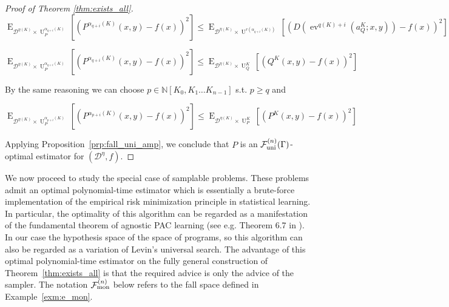 \documentclass[11pt]{article}
\numberwithin{equation}{section}
\theoremstyle{definition}
\theoremstyle{plain}
\DeclareMathOperator{\E}{E}
\DeclareMathOperator{\Ev}{ev}
\DeclareMathOperator{\Un}{U}
\newcommand{\Nats}{\mathbb{N}}
\newcommand{\NatPoly}{\Nats[K_0, K_1 \ldots K_{n-1}]}
\newcommand{\Dist}{\mathcal{D}}
\newcommand{\Fall}{\mathcal{F}}
\newcommand{\FallU}{{\Fall_{\textnormal{uni}}^{(n)}}}
\newcommand{\FallM}{\Fall_{\textnormal{mon}}^{(n)}}
\begin{document}
\begin{proof}[Proof of Theorem \ref{thm:exists_all}]
\[\E_{ \Dist^{\eta(K)} \times \Un_P^{\alpha_{q+i}(K)}}[(P^{\alpha_{q+i}(K)}(x,y)-f(x))^2] \leq \E_{\Dist^{\eta(K)} \times \Un^{r(\alpha_{q+i}(K))}}[(D(\Ev^{q(K)+i}(a_Q^K;x,y))-f(x))^2]\]

\[\E_{ \Dist^{\eta(K)} \times \Un_P^{\alpha_{q+i}(K)}}[(P^{\alpha_{q+i}(K)}(x,y)-f(x))^2] \leq \E_{\Dist^{\eta(K)} \times \Un_Q^K}[(Q^K(x,y)-f(x))^2]\]

By the same reasoning we can choose ${p \in \NatPoly}$ s.t. ${p \geq q}$ and

\[\E_{ \Dist^{\eta(K)} \times \Un_P^{\alpha_{p+i}(K)}}[(P^{\alpha_{p+i}(K)}(x,y)-f(x))^2] \leq \E_{\Dist^{\eta(K)} \times \Un_P^K}[(P^K(x,y)-f(x))^2]\]

Applying Proposition~\ref{prp:fall_uni_amp}, we conclude that ${P}$ is an ${\FallU(\Gamma)}$-optimal estimator for ${(\Dist^\eta,f)}$.
%
\end{proof}

We now proceed to study the special case of samplable problems. These problems admit an optimal polynomial-time estimator which is essentially a brute-force implementation of the empirical risk minimization principle in statistical learning. In particular, the optimality of this algorithm can be regarded as a manifestation of the fundamental theorem of agnostic PAC learning (see e.g. Theorem 6.7 in \cite{Shalev-Shwartz_2014}). In our case the hypothesis space of the space of programs, so this algorithm can also be regarded as a variation of Levin's universal search. The advantage of this optimal polynomial-time estimator on the fully general construction of Theorem~\ref{thm:exists_all} is that the required advice is only the advice of the sampler. The notation $\FallM$ below refers to the fall space defined in Example~\ref{exm:e_mon}.
\end{document}
